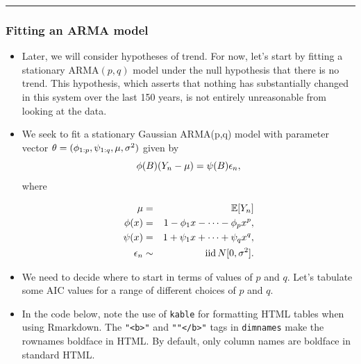 \documentclass[]{article}
\begin{document}
\begin{center}\rule{0.5\linewidth}{\linethickness}\end{center}

\subsubsection{Fitting an ARMA model}\label{fitting-an-arma-model}

\begin{itemize}
\item
  Later, we will consider hypotheses of trend. For now, let's start by
  fitting a stationary ARMA\((p,q)\) model under the null hypothesis
  that there is no trend. This hypothesis, which asserts that nothing
  has substantially changed in this system over the last 150 years, is
  not entirely unreasonable from looking at the data.
\item
  We seek to fit a stationary Gaussian ARMA(p,q) model with parameter
  vector \(\theta=(\phi_{1:p},\psi_{1:q},\mu,\sigma^2)\) given by
  \[ \phi(B)(Y_n-\mu) = \psi(B) \epsilon_n,\] where

  \begin{eqnarray}
  \mu &=& \mathbb{E}[Y_n]
  \\
  \phi(x)&=&1-\phi_1 x-\dots -\phi_px^p,
  \\ 
  \psi(x)&=&1+\psi_1 x+\dots +\psi_qx^q, 
  \\
  \epsilon_n&\sim&\mathrm{ iid }\, N[0,\sigma^2].
  \end{eqnarray}
\item
  We need to decide where to start in terms of values of \(p\) and
  \(q\). Let's tabulate some AIC values for a range of different choices
  of \(p\) and \(q\).
\item
  In the code below, note the use of \texttt{kable} for formatting HTML
  tables when using Rmarkdown. The \texttt{"\textless{}b\textgreater{}"}
  and \texttt{""\textless{}/b\textgreater{}"} tags in \texttt{dimnames}
  make the rownames boldface in HTML. By default, only column names are
  boldface in standard HTML.
\end{itemize}
\end{document}
